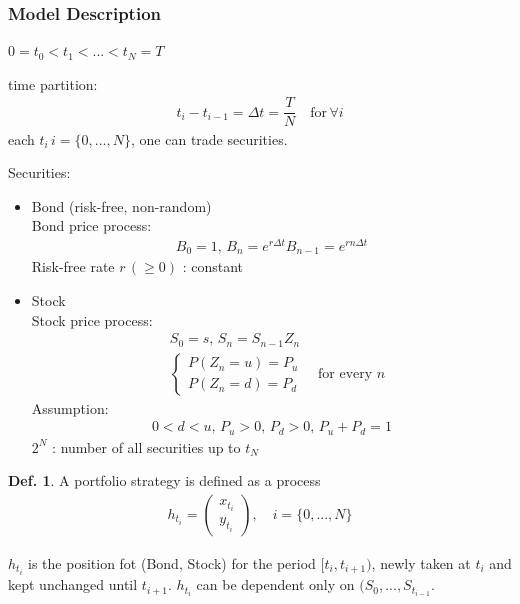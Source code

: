 \documentclass[a4paper,11pt]{jsarticle}
\theoremstyle{definition}
\newtheorem{definition}{Def.}[subsection]
\newcommand{\df}[2]{\dfrac{#1}{#2}}
\begin{document}
\subsubsection{Model Description}
$0=t_0<t_1<...<t_N=T$

time partition:
\begin{align}
  t_i-t_{i-1}=\Delta t=\df{T}{N} \quad \mbox{for} \,
  \forall i
\end{align}
each $t_i \, i=\{0,...,N\}$, one can trade securities.

Securities:
\begin{itemize}
  \item Bond (risk-free, non-random) \\
  Bond price process:
  \begin{align}
    B_0=1, \, B_n=e^{r\Delta t} B_{n-1}=e^{rn\Delta t}
  \end{align}
  Risk-free rate $r \, (\geq 0)$ : constant

  \item Stock \\
  Stock price process:
  \begin{align}
    &S_0=s, \, S_n=S_{n-1}Z_n \\
    &\begin{cases}
      P(Z_n=u)=P_u \\
      P(Z_n=d)=P_d
    \end{cases}
    \quad \mbox{for every } n
  \end{align}
  Assumption:
  \begin{align}
    0<d<u, \, P_u>0, \, P_d>0, \, P_u+P_d=1
  \end{align}
  $2^N$ : number of all securities up to $t_N$
\end{itemize}


\begin{definition}
  A portfolio strategy is defined as a process
  \begin{align}
    h_{t_i}=\left(
    \begin{array}{c}
      x_{t_i} \\
      y_{t_i}
    \end{array}
    \right)
    , \quad i=\{0,...,N\}
  \end{align}

  $h_{t_i}$ is the position fot (Bond, Stock)
  for the period $[t_i, t_{i+1})$, newly taken at $t_i$
  and kept unchanged until $t_{i+1}$.
  $h_{t_i}$ can be dependent only on $(S_0,...,S_{t_{i-1}}$.
\end{definition}
\end{document}
